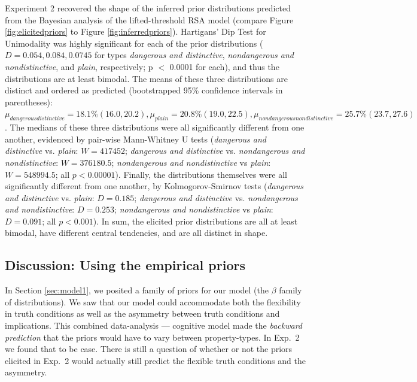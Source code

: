 \documentclass[10pt,letterpaper]{article}
\begin{document}
Experiment 2 recovered the shape of the inferred prior distributions predicted from the Bayesian analysis of the lifted-threshold RSA model (compare Figure \ref{fig:elicitedpriors} to Figure \ref{fig:inferredpriors}). 
%
Hartigans' Dip Test for Unimodality was highly significant for each of the prior distributions ($D = 0.054, 0.084, 0.0745$ for types \emph{dangerous and distinctive}, \emph{nondangerous and nondistinctive}, and \emph{plain}, respectively; p $<$ 0.0001 for each), and thus the distributions are at least bimodal. 
%
The means of these three distributions are distinct and ordered as predicted (bootstrapped 95\% confidence intervals in parentheses): $\mu_{dangerousdistinctive} = 18.1\% (16.0, 20.2), \mu_{plain} = 20.8\% (19.0, 22.5), \mu_{nondangerousnondistinctive} = 25.7\% (23.7, 27.6)$.
%
The medians of these three distributions were all significantly different from one another, evidenced by pair-wise Mann-Whitney U tests (\emph{dangerous and distinctive} vs. \emph{plain}: $W=417452$; \emph{dangerous and distinctive} vs. \emph{nondangerous and nondistinctive}: $W=376180.5$; \emph{nondangerous and nondistinctive} vs \emph{plain}: $W=548994.5$; all $p < 0.00001$). 
%
Finally, the distributions themselves were all significantly different from one another, by Kolmogorov-Smirnov tests (\emph{dangerous and distinctive} vs. \emph{plain}: $D = 0.185$;  \emph{dangerous and distinctive} vs. \emph{nondangerous and nondistinctive}: $D = 0.253$; \emph{nondangerous and nondistinctive} vs \emph{plain}: $D = 0.091$; all $p < 0.001$). In sum, the elicited prior distributions are all at least bimodal, have different central tendencies, and are all distinct in shape.


\subsection{Discussion: Using the empirical priors}

In Section \ref{sec:model1}, we posited a family of priors for our model (the $\beta$ family of distributions). We saw that our model could accommodate both the flexibility in truth conditions as well as the asymmetry between truth conditions and implications. This combined data-analysis --- cognitive model made the \emph{backward prediction} that the priors would have to vary between property-types. In Exp.~2 we found that to be case. There is still a question of whether or not the priors elicited in Exp.~2 would actually still predict the flexible truth conditions and the asymmetry.  
\end{document}
